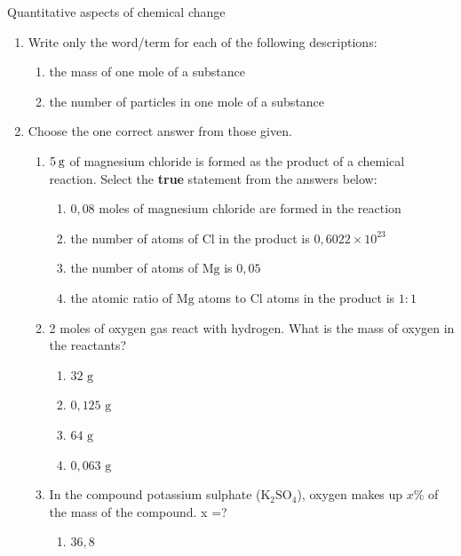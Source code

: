             \begin{eocexercises}{Quantitative aspects of chemical change}
            \nopagebreak \noindent
\begin{enumerate}[noitemsep, label=\textbf{\arabic*}. ] 
\item Write only the word/term for each of the following descriptions:
 \begin{enumerate}[noitemsep, label=\textbf{\alph*}. ] 
 \item the mass of one mole of a substance
 \item the number of particles in one mole of a substance
\end{enumerate}
\item Choose the one correct answer from those given.
 \begin{enumerate}[noitemsep, label=\textbf{\alph*}. ] 
 \item $5\phantom{\rule{2pt}{0ex}}\text{g}$ of magnesium chloride is formed as the product of a chemical reaction. Select the \textbf{true} statement from the answers below:
  \begin{enumerate}[noitemsep, label=\textbf{\roman*}. ] 
  \item $0,08$ moles of magnesium chloride are formed in the reaction
  \item the number of atoms of $\text{Cl}$ in the product is $0,6022\ensuremath{\times}{10}^{23}$
  \item the number of atoms of $\text{Mg}$ is $0,05$
  \item the atomic ratio of $\text{Mg}$ atoms to $\text{Cl}$ atoms in the product is $1:1$
  \end{enumerate}
 \item 2 moles of oxygen gas react with hydrogen. What is the mass of oxygen in the reactants?
  \begin{enumerate}[noitemsep, label=\textbf{\roman*}. ] 
  \item $32 \text{ g}$
  \item $0,125 \text{ g}$
  \item $64 \text{ g}$
  \item $0,063 \text{ g}$
  \end{enumerate}
 \item In the compound potassium sulphate ($\text{K}{}_{2}\text{SO}{}_{4}$), oxygen makes up $x\%$ of the mass of the compound. x =?
  \begin{enumerate}[noitemsep, label=\textbf{\roman*}. ] 
  \item $36,8$

\end{enumerate}
\end{enumerate}
\end{enumerate}
\end{eocexercises}
